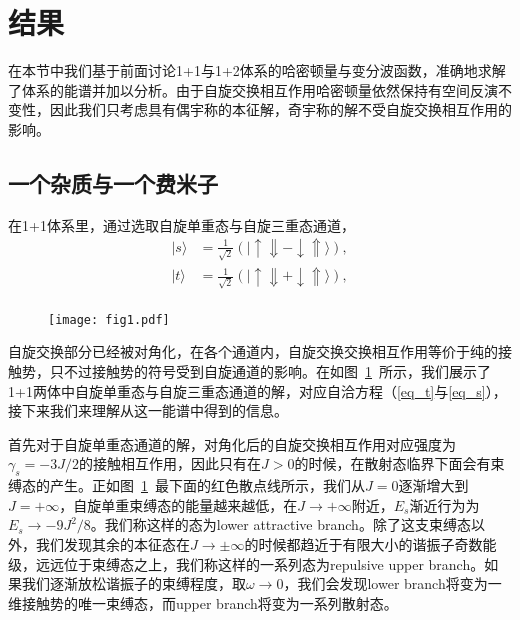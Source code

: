 \section{结果}\label{sec:spex-result}
在本节中我们基于前面讨论1+1与1+2体系的哈密顿量与变分波函数，准确地求解了体系的能谱并加以分析。由于自旋交换相互作用哈密顿量依然保持有空间反演不变性，因此我们只考虑具有偶宇称的本征解，奇宇称的解不受自旋交换相互作用的影响。

\subsection{一个杂质与一个费米子}
在1+1体系里，通过选取自旋单重态与自旋三重态通道，
\begin{equation}
\begin{split}
    |s\rangle &= \frac{1}{\sqrt{2}}(|\uparrow\Downarrow - \downarrow\Uparrow\rangle),\\
    |t\rangle &= \frac{1}{\sqrt{2}}(|\uparrow\Downarrow + \downarrow\Uparrow\rangle),\\
\end{split}
\end{equation}

\begin{figure}[!htbp]
    \centering
    \texttt{[image: fig1.pdf]}
    \label{fig:fig1}
\end{figure}

自旋交换部分已经被对角化，在各个通道内，自旋交换交换相互作用等价于纯的接触势，只不过接触势的符号受到自旋通道的影响。在如图~\ref{fig:fig1}~所示，我们展示了1+1两体中自旋单重态与自旋三重态通道的解，对应自洽方程（\ref{eq_t}与\ref{eq_s}），接下来我们来理解从这一能谱中得到的信息。



首先对于自旋单重态通道的解，对角化后的自旋交换相互作用对应强度为$\gamma_s=-3J/2$的接触相互作用，因此只有在$J>0$的时候，在散射态临界下面会有束缚态的产生。正如图~\ref{fig:fig1}~最下面的红色散点线所示，我们从$J=0$逐渐增大到$J=+\infty$，自旋单重束缚态的能量越来越低，在$J\to + \infty$附近，$E_s$渐近行为为$E_s\rightarrow -9J^2/8$。我们称这样的态为lower attractive branch。除了这支束缚态以外，我们发现其余的本征态在$J\to \pm \infty$的时候都趋近于有限大小的谐振子奇数能级，远远位于束缚态之上，我们称这样的一系列态为repulsive upper branch。如果我们逐渐放松谐振子的束缚程度，取$\omega\to 0$，我们会发现lower branch将变为一维接触势的唯一束缚态，而upper branch将变为一系列散射态。

